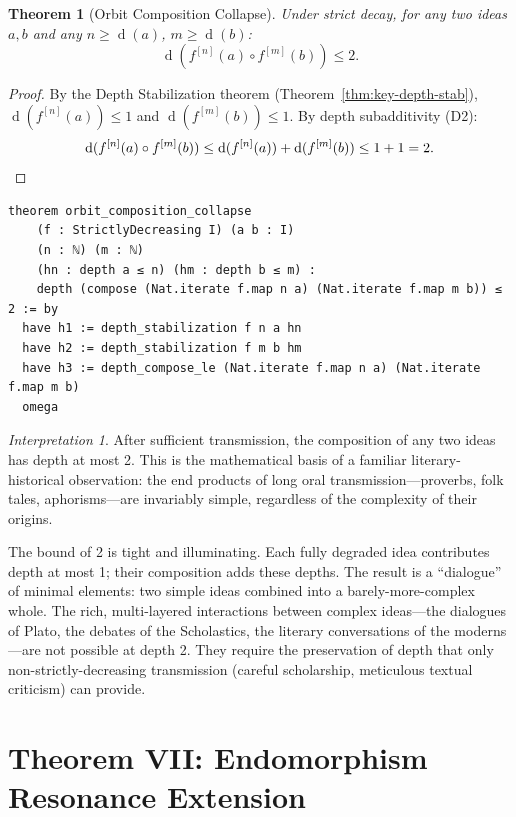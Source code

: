 \documentclass[11pt,openany]{book}
\theoremstyle{definition}
\theoremstyle{plain}
\newtheorem{theorem}[axiom]{Theorem}
\theoremstyle{remark}
\newtheorem{interpretation}[axiom]{Interpretation}
\newcommand{\compose}{\circ}                 %
\newcommand{\depth}{\operatorname{d}}       %
\begin{document}
\begin{theorem}[Orbit Composition Collapse]
\label{thm:key-orbit-collapse}
Under strict decay, for any two ideas $a, b$ and any $n \geq \depth(a)$, $m \geq \depth(b)$:
\[
\depth(f^{[n]}(a) \compose f^{[m]}(b)) \leq 2.
\]
\end{theorem}

\begin{proof}
By the Depth Stabilization theorem (Theorem~\ref{thm:key-depth-stab}), $\depth(f^{[n]}(a)) \leq 1$ and $\depth(f^{[m]}(b)) \leq 1$. By depth subadditivity (D2):
\[
\depth(f^{[n]}(a) \compose f^{[m]}(b)) \leq \depth(f^{[n]}(a)) + \depth(f^{[m]}(b)) \leq 1 + 1 = 2. \qedhere
\]
\end{proof}

\begin{lstlisting}
theorem orbit_composition_collapse
    (f : StrictlyDecreasing I) (a b : I)
    (n : ℕ) (m : ℕ)
    (hn : depth a ≤ n) (hm : depth b ≤ m) :
    depth (compose (Nat.iterate f.map n a) (Nat.iterate f.map m b)) ≤ 2 := by
  have h1 := depth_stabilization f n a hn
  have h2 := depth_stabilization f m b hm
  have h3 := depth_compose_le (Nat.iterate f.map n a) (Nat.iterate f.map m b)
  omega
\end{lstlisting}

\begin{interpretation}
After sufficient transmission, the composition of any two ideas has depth at most 2. This is the mathematical basis of a familiar literary-historical observation: the end products of long oral transmission---proverbs, folk tales, aphorisms---are invariably simple, regardless of the complexity of their origins.

The bound of 2 is tight and illuminating. Each fully degraded idea contributes depth at most 1; their composition adds these depths. The result is a ``dialogue'' of minimal elements: two simple ideas combined into a barely-more-complex whole. The rich, multi-layered interactions between complex ideas---the dialogues of Plato, the debates of the Scholastics, the literary conversations of the moderns---are not possible at depth 2. They require the preservation of depth that only non-strictly-decreasing transmission (careful scholarship, meticulous textual criticism) can provide.
\end{interpretation}

\section{Theorem VII: Endomorphism Resonance Extension}
\end{document}
